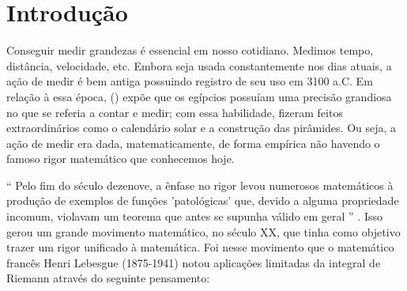 




\chapter{Introdução}

    Conseguir medir grandezas é essencial em nosso cotidiano.
    Medimos tempo, distância, velocidade, etc.
    Embora seja usada constantemente nos dias atuais, a ação de medir é bem antiga possuindo registro de seu uso em 3100 a.C.
    Em relação à essa época, \citeauthor{boy}(\citeyear{boy}) expõe que os egípcios possuíam uma precisão grandiosa no que se referia a contar e medir;
    com essa habilidade, fizeram feitos extraordinários como o calendário solar e a construção das pirâmides.
    Ou seja, a ação de medir era dada, matematicamente, de forma empírica não havendo o famoso rigor matemático que conhecemos hoje.
   
    \enquote{
    	Pelo fim do século dezenove, a ênfase no rigor levou numerosos matemáticos à produção de exemplos de funções 'patológicas' que, devido a alguma propriedade incomum, violavam um teorema que antes se supunha válido em geral
    } \cite[p.415]{boy}.
    Isso gerou um grande movimento matemático, no século XX, que tinha como objetivo trazer um rigor unificado à matemática.
    Foi nesse movimento que o matemático francês Henri Lebesgue (1875-1941) notou aplicações limitadas da integral de Riemann através do seguinte pensamento:
    
